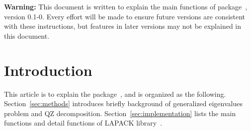 
{\color{red} \bf Warning:} This document is written to explain the main
functions of  package~\citep{Chen2013QZpackage}, version 0.1-0.
Every effort will be made to ensure future versions are consistent with
these instructions, but features in later versions may not be explained
in this document.


\section[Introduction]{Introduction}
\label{sec:introduction}


This article is to explain the  package~\citep{Chen2013QZpackage}, and
is organized as the following. Section~\ref{sec:methods} introduces briefly
background of generalized eigenvalues problem and QZ decomposition.
Section~\ref{sec:implementation} lists the main functions and detail
 functions of LAPACK library~\citep{laug}.

